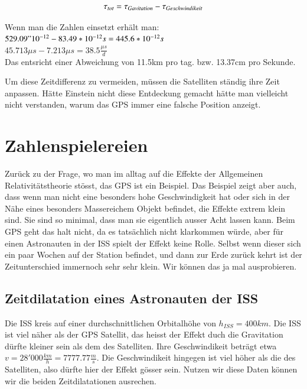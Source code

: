 \begin{refsection}
\begin{equation}
\tau_{tot} = \tau_{Gavitation} - \tau_{Geschwindikeit}\\
\end{equation}

\noindent{}Wenn man die Zahlen einsetzt erhält man:\\

\(  529.09 "10^{-12}  -  83.49 * 10^{-12}s =  445.6 * 10^{-12}s  \) \\

\(  45.713\mu{}s - 7.213\mu{}s = 38.5\frac{\mu{}s}{d} \) \\

\noindent{}Das entsricht einer Abweichung von 11.5km pro tag. bzw. 13.37cm pro Sekunde. 

Um diese Zeitdifferenz zu vermeiden, müssen die Satelliten ständig ihre Zeit anpassen. Hätte Einstein nicht diese Entdeckung gemacht hätte man vielleicht nicht verstanden, warum das GPS immer eine falsche Position anzeigt. 

\section{Zahlenspielereien}
Zurück zu der Frage, wo man im alltag auf die Effekte der Allgemeinen Relativitätstheorie stösst, das GPS ist ein Beispiel. Das Beispiel zeigt aber auch, dass wenn man nicht eine besonders hohe Geschwindigkeit hat oder sich in der Nähe eines besonders Massereichem Objekt befindet, die Effekte extrem klein sind. Sie sind so minimal, dass man sie eigentlich ausser Acht lassen kann. Beim GPS geht das halt nicht, da es tatsächlich nicht klarkommen würde, aber für einen Astronauten in der ISS spielt der Effekt keine Rolle. Selbst wenn dieser sich ein paar Wochen auf der Station befindet, und dann zur Erde zurück kehrt ist der Zeitunterschied immernoch sehr sehr klein. Wir können das ja mal ausprobieren.

\subsection{Zeitdilatation eines Astronauten der ISS}
Die ISS kreis auf einer durchschnittlichen Orbitalhöhe von \( h_{ISS} = 400km \). Die ISS ist viel näher als der GPS Satellit, das heisst der Effekt duch die Gravitation dürfte kleiner sein als dem des Satelliten. Ihre Geschwindikeit beträgt etwa \( v = 28'000\frac{km}{h} = 7777.77\frac{m}{s} \). Die Geschwindikeit hingegen ist viel höher als die des Satelliten, also dürfte hier der Effekt gösser sein. Nutzen wir diese Daten können wir die beiden Zeitdilatationen ausrechen.\\


\end{refsection}
